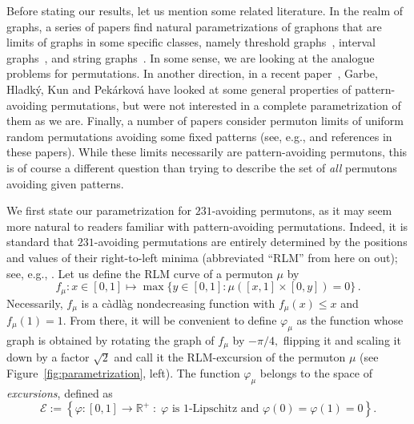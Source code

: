 \documentclass[a4paper,11pt]{amsart}
\newcommand{\R}{\mathbb R}
\theoremstyle{definition}
\begin{document}
Before stating our results, let us mention some related literature.
In the realm of graphs, a series of papers find natural parametrizations of graphons
that are limits of graphs in some specific classes, namely threshold graphs~\cite{diaconis2008threshold_graphons}, 
interval graphs~\cite{diaconis2013interval_graphons}, and string graphs~\cite{janson2017string_graphons}.
In some sense, we are looking at the analogue problems for permutations.
In another direction, in a recent paper~\cite{garbe2024pattern_avoiding_permutons},
Garbe, Hladk{\'y}, Kun and Pek{\'a}rkov{\'a} have looked at some general properties of pattern-avoiding permutations,
but were not interested in a complete parametrization of them as we are. 
Finally, a number of papers consider permuton limits of uniform random permutations avoiding some fixed patterns 
(see, e.g., \cite{bassino2022scaling,borga2022strong-semi-baxter,hohmeier2025permuton_limits} and references in these papers). 
While these limits necessarily are pattern-avoiding permutons, 
this is of course a different question than trying to describe the set of {\em all} permutons avoiding given patterns.
\medskip


We first state our parametrization for $231$-avoiding permutons,
as it may seem more natural to readers familiar with pattern-avoiding permutations.
Indeed, it is standard that $231$-avoiding permutations are entirely determined
by the positions and values of their right-to-left minima
(abbreviated ``RLM'' from here on out); see, e.g., \cite[Chapter 4]{BonaLivre}.
Let us define the RLM curve of a permuton $\mu$ by
\[
    f_\mu: x\in[0,1] \mapsto \max\{ y\in[0,1] : \mu([x,1]\times[0,y])=0 \} \,.
\]
Necessarily, $f_\mu$ is a càdlàg nondecreasing function with $f_\mu(x) \le x$ and $f_\mu(1)=1$.
From there, it will be convenient to define  $\varphi_\mu$ as the function whose graph is obtained by
rotating the graph of $f_\mu$ by $-\pi/4,$ flipping it and scaling it down by a factor $\sqrt 2$ and call it the RLM-excursion of the permuton $\mu$ 
(see Figure~\ref{fig:parametrization}, left).
The function $\varphi_\mu$ belongs to the space of {\em excursions}, defined as
\begin{equation}\label{eqn:defn_F}
	\mathcal{E} := \left\{ \varphi : [0,1] \to \R^+ \;:\; \mbox{$\varphi$ is $1$-Lipschitz and } \varphi(0)=\varphi(1)=0 \right\}.
\end{equation}
\end{document}
